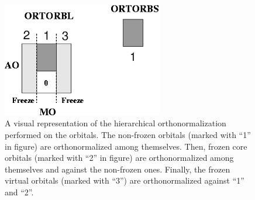 \begin{figure}[ht]
\begin{center}
\includegraphics[width=7cm,keepaspectratio]{02_localization/images/matrix-2.eps}
\caption{\footnotesize A visual representation of the hierarchical
orthonormalization performed on the orbitals. The non-frozen orbitals
(marked with ``1'' in figure) are orthonormalized among themselves.
Then, frozen core orbitals (marked with ``2'' in figure) are orthonormalized
among themselves and against the non-frozen ones. Finally, the frozen
virtual orbitals (marked with ``3'') are orthonormalized against ``1'' and ``2''.
}
\label{fig:matrix-2}
\end{center}
\end{figure}

